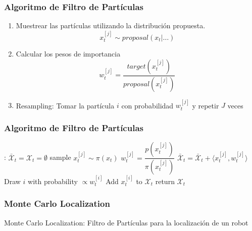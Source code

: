 \begin{frame}
    \frametitle{Algoritmo de Filtro de Partículas}
    \begin{enumerate}
        \item Muestrear las partículas utilizando la distribución propuesta.
        \begin{equation*}
            x_t^{[j]} \sim proposal(x_t | \ldots)
        \end{equation*}
        \item Calcular los pesos de importancia
        \begin{equation*}
            w_t^{[j]} = \frac{target(x_t^{[j]})}{proposal(x_t^{[j]})}
        \end{equation*}
        \item Resampling: Tomar la partícula $i$ con probabilidad $w_t^{[j]}$ y repetir $J$ veces 
    \end{enumerate}
\end{frame}

\begin{frame}
    \frametitle{Algoritmo de Filtro de Partículas}
    \begin{algorithmic}[1]
    :
    \State $\bar{\mathcal{X}}_t = \mathcal{X}_t = \emptyset$
        \State sample $x_t^{[j]} \sim \pi(x_t)$
        \State $w_t^{[j]} = \dfrac{p(x_t^{[j]})}{\pi(x_{t}^{[j]})}$
        \State $\bar{\mathcal{X}}_t = \bar{\mathcal{X}}_t + \langle x_t^{[j]}, w_t^{[j]}\rangle$
    \EndFor
        \State Draw $i$ with probability $\propto w_t^{[i]}$
        \State Add $x_t^{[i]}$ to $\mathcal{X}_t$
    \EndFor
    \State return $\mathcal{X}_t$
    \EndProcedure
    \end{algorithmic}
\end{frame}


\begin{frame}
    \frametitle{Monte Carlo Localization}

    Monte Carlo Localization: Filtro de Partículas para la localización de un robot

\end{frame}




